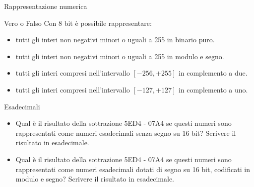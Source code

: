 \documentclass[11pt]{article}
\begin{document}
\begin{quiz}{Rappresentazione numerica}
\begin{cloze}[points=1,shuffle=false]{Vero o Falso}
Con 8 bit è possibile rappresentare:
\begin{itemize}
\item tutti gli interi non negativi minori o uguali a 255 in binario puro.
\item tutti gli interi non negativi minori o uguali a 255 in modulo e segno.
\item tutti gli interi compresi nell'intervallo $[-256,+255]$ in complemento a due.
\item tutti gli interi compresi nell'intervallo $[-127,+127]$ in complemento a uno.
\end{itemize}
\end{cloze}

\begin{cloze}[points=1,shuffle=false]{Esadecimali}
\begin{itemize}
\item Qual è il risultato della sottrazione 5ED4 - 07A4 se questi numeri sono rappresentati come numeri esadecimali senza segno su 16 bit? Scrivere il risultato in esadecimale.
\item Qual è il risultato della sottrazione 5ED4 - 07A4 se questi numeri sono rappresentati come numeri esadecimali dotati di segno su 16 bit, codificati in modulo e segno? Scrivere il risultato in esadecimale.
\end{itemize}
\end{cloze}


\end{quiz}
\end{document}
